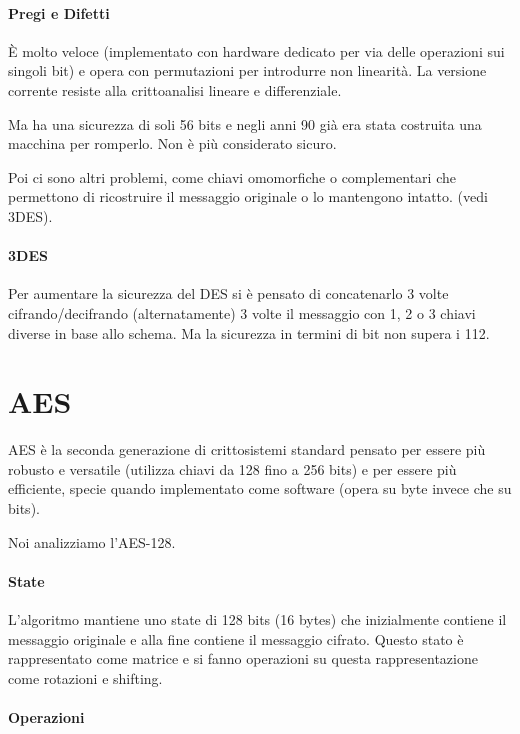 \paragraph{Pregi e Difetti}

\`E molto veloce (implementato con hardware dedicato per via delle operazioni sui singoli bit) e opera con permutazioni per introdurre non linearit\`a. La versione corrente resiste alla crittoanalisi lineare e differenziale.

Ma ha una sicurezza di soli 56 bits e negli anni 90 gi\`a era stata costruita una macchina per romperlo. Non \`e pi\`u considerato sicuro.

Poi ci sono altri problemi, come chiavi omomorfiche o complementari che permettono di ricostruire il messaggio originale o lo mantengono intatto. (vedi 3DES).

\paragraph{3DES}

Per aumentare la sicurezza del DES si \`e pensato di concatenarlo 3 volte cifrando/decifrando (alternatamente) 3 volte il messaggio con 1, 2 o 3 chiavi diverse in base allo schema. Ma la sicurezza in termini di bit non supera i 112.

\section{AES}

AES \`e la seconda generazione di crittosistemi standard pensato per essere pi\`u robusto e versatile (utilizza chiavi da 128 fino a 256 bits) e per essere pi\`u efficiente, specie quando implementato come software (opera su byte invece che su bits).

Noi analizziamo l'AES-128.

\paragraph{State}

L'algoritmo mantiene uno state di 128 bits (16 bytes) che inizialmente contiene il messaggio originale e alla fine contiene il messaggio cifrato. Questo stato \`e rappresentato come matrice e si fanno operazioni su questa rappresentazione come rotazioni e shifting.

\paragraph{Operazioni}

